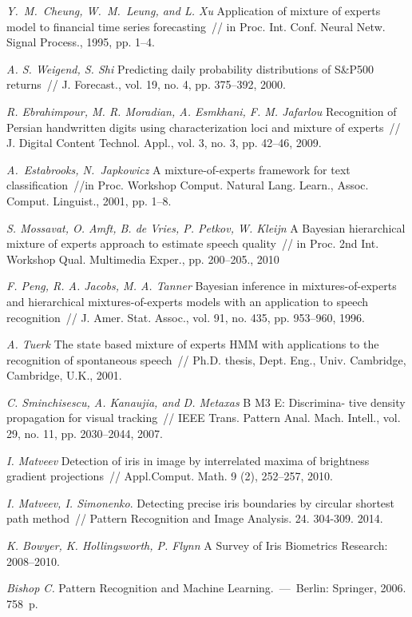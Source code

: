 \documentclass[12pt, twoside]{article}
\begin{document}
\begin{thebibliography}{99}
	\textit{Y.~M.~Cheung, W.~M.~Leung, and L. Xu} Application of mixture of experts model to financial time series forecasting~// in Proc. Int. Conf. Neural Netw. Signal Process., 1995, pp. 1--4.
	
	\textit{A. S. Weigend, S. Shi} Predicting daily probability distributions of S\&P500 returns~// J. Forecast., vol. 19, no. 4, pp. 375--392, 2000.
	
	\textit{R. Ebrahimpour, M. R. Moradian, A. Esmkhani, F. M. Jafarlou} Recognition of Persian handwritten digits using characterization loci and mixture of experts~// J. Digital Content Technol. Appl., vol. 3, no. 3, pp. 42–46, 2009.
	
	\textit{A.~Estabrooks, N.~Japkowicz} A mixture-of-experts framework for text classification~//in Proc. Workshop Comput. Natural Lang. Learn., Assoc. Comput. Linguist., 2001, pp. 1--8.
	
	\textit{S. Mossavat, O. Amft, B. de Vries, P. Petkov, W. Kleijn} A Bayesian hierarchical mixture of experts approach to estimate speech quality~// in Proc. 2nd Int. Workshop Qual. Multimedia Exper., pp. 200--205., 2010

	\textit{F. Peng, R. A. Jacobs, M. A. Tanner} Bayesian inference in mixtures-of-experts and hierarchical mixtures-of-experts models with an application to speech recognition~// J. Amer. Stat. Assoc., vol. 91, no. 435, pp. 953–960, 1996.
	
	\textit{A. Tuerk} The state based mixture of experts HMM with applications to the recognition of spontaneous speech~// Ph.D. thesis, Dept. Eng., Univ. Cambridge, Cambridge, U.K., 2001.
	
	\textit{C. Sminchisescu, A. Kanaujia, and D. Metaxas} B M3 E: Discrimina- tive density propagation for visual tracking~// IEEE Trans. Pattern Anal. Mach. Intell., vol. 29, no. 11, pp. 2030–2044, 2007.

	\textit{I. Matveev} Detection of iris in image by interrelated maxima of brightness gradient projections~// Appl.Comput. Math. 9 (2), 252–257, 2010.

	\textit{I. Matveev, I. Simonenko}. Detecting precise iris boundaries by circular shortest path method~// Pattern Recognition and Image Analysis. 24. 304-309. 2014.
	
	\textit{K. Bowyer, K. Hollingsworth, P. Flynn} A Survey of Iris Biometrics Research: 2008–2010.
	
	\textit{Bishop C.} Pattern Recognition and Machine Learning.~---~Berlin: Springer, 2006. 758~p.

 \end{thebibliography}
 
\end{document}
